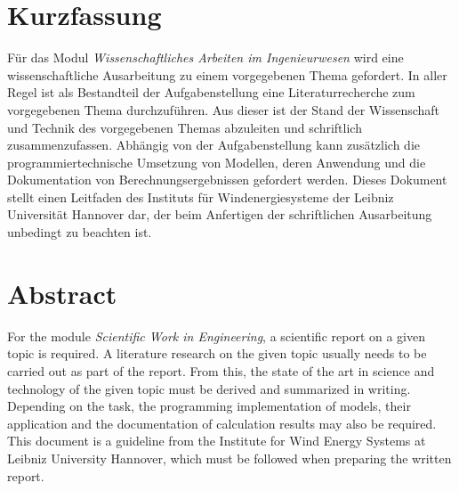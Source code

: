 \vspace*{0mm}
\section*{Kurzfassung}

Für das Modul \textit{Wissenschaftliches Arbeiten im Ingenieurwesen} wird eine wissenschaftliche Ausarbeitung zu einem vorgegebenen Thema gefordert. In aller Regel ist als Bestandteil der Aufgabenstellung eine Literaturrecherche zum vorgegebenen Thema durchzuführen. Aus dieser ist der Stand der Wissenschaft und Technik des vorgegebenen Themas abzuleiten und schriftlich zusammenzufassen. Abhängig von der Aufgabenstellung kann zusätzlich die programmiertechnische Umsetzung von Modellen, deren Anwendung und die Dokumentation von Berechnungsergebnissen gefordert werden. Dieses Dokument stellt einen Leitfaden des Instituts für Windenergiesysteme der Leibniz Universität Hannover dar, der beim Anfertigen der schriftlichen Ausarbeitung unbedingt zu beachten ist. \\

\vspace*{9mm}
\section*{Abstract}

For the module \textit{Scientific Work in Engineering}, a scientific report on a given topic is required. A literature research on the given topic usually needs to be carried out as part of the report. From this, the state of the art in science and technology of the given topic must be derived and summarized in writing. Depending on the task, the programming implementation of models, their application and the documentation of calculation results may also be required. This document is a guideline from the Institute for Wind Energy Systems at Leibniz University Hannover, which must be followed when preparing the written report. \\

\clearpage
